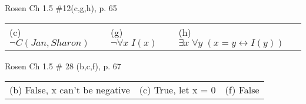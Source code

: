 \documentclass[12pt,addpoints]{exam}
\newcommand{\ra}{\rightarrow}
\newcommand{\lra}{\leftrightarrow}
\begin{document}
\begin{questions}
\question[6] Rosen Ch 1.5 \#12(c,g,h), p. 65
    \ifprintanswers
        \vspace{-12pt}
    \fi
\begin{solution}
    \begin{tabular}{lll}
    	(c) $\neg C(Jan, Sharon)$ & (g) $\neg \forall x\; I(x)$ & (h) $\exists x\; \forall y\; (x=y \lra I(y))$ 
    \end{tabular}
\end{solution}


\question[3] Rosen Ch 1.5 \# 28 (b,c,f), p. 67
    \ifprintanswers
        \vspace{-12pt}
    \fi
\begin{solution}
    \begin{tabular}{lll}
    	(b) False, x can't be negative & (c) True, let x = 0 & (f) False 
    \end{tabular}
\end{solution}




\end{questions}
\end{document}
